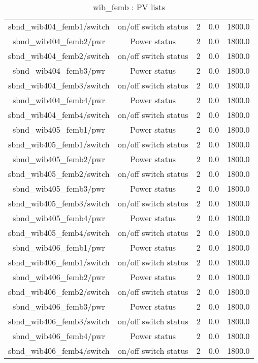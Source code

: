 \begin{table}[ptb]
\begin{tabular}{c | c c c c}
sbnd_wib404_femb1/switch & on/off switch status & 2 & 0.0 & 1800.0\\ 
sbnd_wib404_femb2/pwr & Power status & 2 & 0.0 & 1800.0\\ 
sbnd_wib404_femb2/switch & on/off switch status & 2 & 0.0 & 1800.0\\ 
sbnd_wib404_femb3/pwr & Power status & 2 & 0.0 & 1800.0\\ 
sbnd_wib404_femb3/switch & on/off switch status & 2 & 0.0 & 1800.0\\ 
sbnd_wib404_femb4/pwr & Power status & 2 & 0.0 & 1800.0\\ 
sbnd_wib404_femb4/switch & on/off switch status & 2 & 0.0 & 1800.0\\ 
sbnd_wib405_femb1/pwr & Power status & 2 & 0.0 & 1800.0\\ 
sbnd_wib405_femb1/switch & on/off switch status & 2 & 0.0 & 1800.0\\ 
sbnd_wib405_femb2/pwr & Power status & 2 & 0.0 & 1800.0\\ 
sbnd_wib405_femb2/switch & on/off switch status & 2 & 0.0 & 1800.0\\ 
sbnd_wib405_femb3/pwr & Power status & 2 & 0.0 & 1800.0\\ 
sbnd_wib405_femb3/switch & on/off switch status & 2 & 0.0 & 1800.0\\ 
sbnd_wib405_femb4/pwr & Power status & 2 & 0.0 & 1800.0\\ 
sbnd_wib405_femb4/switch & on/off switch status & 2 & 0.0 & 1800.0\\ 
sbnd_wib406_femb1/pwr & Power status & 2 & 0.0 & 1800.0\\ 
sbnd_wib406_femb1/switch & on/off switch status & 2 & 0.0 & 1800.0\\ 
sbnd_wib406_femb2/pwr & Power status & 2 & 0.0 & 1800.0\\ 
sbnd_wib406_femb2/switch & on/off switch status & 2 & 0.0 & 1800.0\\ 
sbnd_wib406_femb3/pwr & Power status & 2 & 0.0 & 1800.0\\ 
sbnd_wib406_femb3/switch & on/off switch status & 2 & 0.0 & 1800.0\\ 
sbnd_wib406_femb4/pwr & Power status & 2 & 0.0 & 1800.0\\ 
sbnd_wib406_femb4/switch & on/off switch status & 2 & 0.0 & 1800.0\\ 

\hline
\end{tabular}
\caption{wib\_femb : PV lists}
\label{tab:wib\_femb_PV_list}
\end{table}

